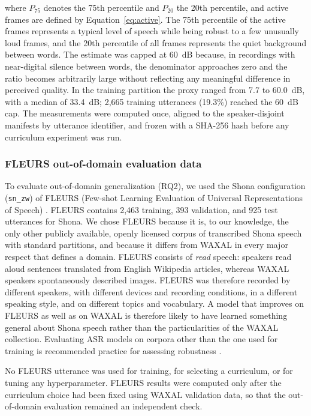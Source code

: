 where $P_{75}$ denotes the 75th percentile and $P_{20}$ the 20th percentile, and
active frames are defined by Equation~\eqref{eq:active}. The 75th percentile of
the active frames represents a typical level of speech while being robust to a
few unusually loud frames, and the 20th percentile of all frames represents the
quiet background between words. The estimate was capped at 60~dB because, in
recordings with near-digital silence between words, the denominator approaches
zero and the ratio becomes arbitrarily large without reflecting any meaningful
difference in perceived quality. In the training partition the proxy ranged from
7.7 to 60.0~dB, with a median of 33.4~dB; 2,665 training utterances (19.3\%)
reached the 60~dB cap. The measurements were computed once, aligned to the
speaker-disjoint manifests by utterance identifier, and frozen with a SHA-256 hash
before any curriculum experiment was run.

\subsubsection{FLEURS out-of-domain evaluation data}
\label{sec:fleurs}

To evaluate out-of-domain generalization (RQ2), we used the Shona configuration
(\texttt{sn\_zw}) of FLEURS (Few-shot Learning Evaluation of Universal
Representations of Speech) \citep{Conneau2022}. FLEURS contains 2,463 training,
393 validation, and 925 test utterances for Shona. We chose FLEURS because it is,
to our knowledge, the only other publicly available, openly licensed corpus of
transcribed Shona speech with standard partitions, and because it differs from
WAXAL in every major respect that defines a domain. FLEURS consists of \emph{read}
speech: speakers read aloud sentences translated from English Wikipedia articles,
whereas WAXAL speakers spontaneously described images. FLEURS was therefore
recorded by different speakers, with different devices and recording conditions,
in a different speaking style, and on different topics and vocabulary. A model
that improves on FLEURS as well as on WAXAL is therefore likely to have learned
something general about Shona speech rather than the particularities of the WAXAL
collection. Evaluating ASR models on corpora other than the one used for training
is recommended practice for assessing robustness \citep{Likhomanenko2021}.

No FLEURS utterance was used for training, for selecting a curriculum, or for
tuning any hyperparameter. FLEURS results were computed only after the curriculum
choice had been fixed using WAXAL validation data, so that the out-of-domain
evaluation remained an independent check.

